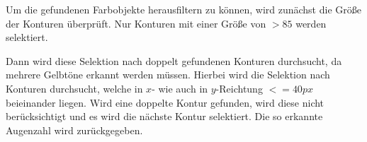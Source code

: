         Um die gefundenen Farbobjekte herausfiltern zu können, wird zunächst die
        Größe der Konturen überprüft.
        Nur Konturen mit einer Größe von $> 85$ werden selektiert.

        Dann wird diese Selektion nach doppelt gefundenen Konturen durchsucht,
        da mehrere Gelbtöne erkannt werden müssen.
        Hierbei wird die Selektion nach Konturen durchsucht, welche in $x$- wie
        auch in $y$-Reichtung $<= 40 px$ beieinander liegen.
        Wird eine doppelte Kontur gefunden, wird diese nicht berücksichtigt
        und es wird die nächste Kontur selektiert.
        Die so erkannte Augenzahl wird zurückgegeben.

